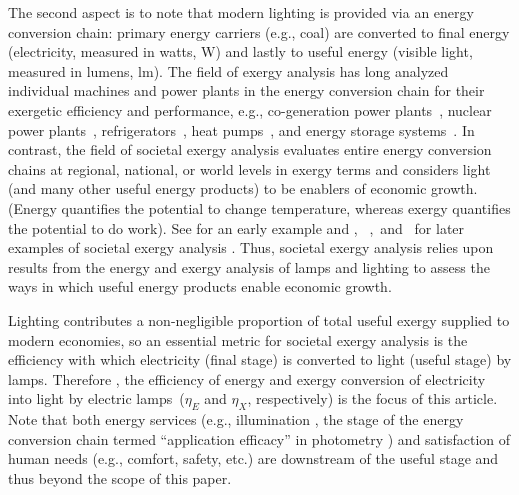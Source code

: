 \documentclass[energies,article,accept,moreauthors,pdftex]{Definitions/mdpi}\usepackage[]{graphicx}\usepackage[]{color}
\newcommand{\ins}[1]{#1}
\newcommand{\rev}[2]{#2}
\providecommand{\DIFaddbegin}{} %
\providecommand{\DIFaddend}{} %
\providecommand{\DIFdelbegin}{} %
\providecommand{\DIFdelend}{} %
\newcommand{\DIFscaledelfig}{0.5}
\newlength{\DIFdelgraphicswidth} %
\newlength{\DIFdelgraphicsheight} %
\newcommand{\DIFaddincludegraphics}[2][]{{\color{blue}\fbox{\DIFOincludegraphics[#1]{#2}}}} %
\newcommand{\DIFdelincludegraphics}[2][]{%
\sbox{\DIFdelgraphicsbox}{\DIFOincludegraphics[#1]{#2}}%
\settoboxwidth{\DIFdelgraphicswidth}{\DIFdelgraphicsbox} %
\settoboxtotalheight{\DIFdelgraphicsheight}{\DIFdelgraphicsbox} %
\scalebox{\DIFscaledelfig}{%
\parbox[b]{\DIFdelgraphicswidth}{\usebox{\DIFdelgraphicsbox}\\[-\baselineskip] \rule{\DIFdelgraphicswidth}{0em}}\llap{\resizebox{\DIFdelgraphicswidth}{\DIFdelgraphicsheight}{%
\setlength{\unitlength}{\DIFdelgraphicswidth}%
\begin{picture}(1,1)%
\thicklines\linethickness{2pt} %
{\color[rgb]{1,0,0}\put(0,0){\framebox(1,1){}}}%
{\color[rgb]{1,0,0}\put(0,0){\line( 1,1){1}}}%
{\color[rgb]{1,0,0}\put(0,1){\line(1,-1){1}}}%
\end{picture}%
}\hspace*{3pt}}} %
} %
\DeclareRobustCommand{\DIFaddbegin}{\DIFOaddbegin \let\includegraphics\DIFaddincludegraphics} %
\DeclareRobustCommand{\DIFaddend}{\DIFOaddend \let\includegraphics\DIFOincludegraphics} %
\DeclareRobustCommand{\DIFdelbegin}{\DIFOdelbegin \let\includegraphics\DIFdelincludegraphics} %
\DeclareRobustCommand{\DIFdelend}{\DIFOaddend \let\includegraphics\DIFOincludegraphics} %
\begin{document}
The second aspect is to note that 
modern lighting is provided via an energy conversion chain:
primary energy \DIFaddbegin \ins{carriers} \DIFaddend (e.g., coal) \DIFdelbegin \DIFdelend \DIFaddbegin {are} \DIFaddend converted to
final energy (electricity, measured in watts, W) and lastly to
useful energy (visible light, measured in lumens, lm).
\DIFdelbegin \DIFdelend \DIFaddbegin \ins{The field of exergy analysis has long analyzed individual machines
and power plants in the energy conversion chain 
for their exergetic efficiency and performance, e.g.,
co-generation power plants~\cite{Bejan:1996},
nuclear power plants~\cite{Durmayaz:2001}, 
refrigerators~\cite{joybari2013exergy},
heat pumps~\cite{bobbo2019energetic}, and 
energy storage systems~\cite{zwierzchowski2020energy}.
In contrast,} the  field of societal exergy analysis evaluates entire energy conversion chains
at regional, national, or world levels in exergy terms and
considers light (and many other useful energy products)
to be enablers of economic growth.
(Energy quantifies the potential to change temperature,
whereas exergy quantifies the potential to do work).
 See \citet{Nakicenovic1996} for an early example and
\ins{\citet{Guevara:2016a},}
\mbox{%
\citet{Heun:2019aa}, and \citet{Ver-Beek:2020aa}} for later examples
 of societal exergy analysis%
.
Thus, societal exergy analysis 
relies upon results from the energy and exergy analysis of 
lamps and lighting to assess the ways in which useful energy products 
enable economic growth.


Lighting contributes a non-negligible proportion of total useful exergy
supplied to modern economies, so
an essential metric for societal exergy analysis
is the efficiency with which
electricity (final stage) is converted to light (useful stage) by lamps.
Therefore , the efficiency of energy and exergy conversion of electricity
into light by electric lamps~($\eta_E$ and $\eta_X$, respectively)
is the focus of this article.
Note that both energy services (e.g., illumination\DIFdelbegin %
, the stage of the energy conversion chain
termed ``application efficacy'' in photometry 
\cite{rea2001application}) 
and satisfaction of human needs
(e.g., comfort, safety, etc.) are downstream of the useful stage 
and thus \DIFdelbegin %
{beyond the scope of this paper}.
\end{document}
